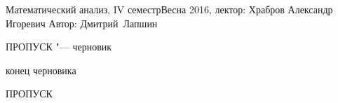 


\BigHeader
    {Математический анализ, IV семестр}{Весна 2016, лектор: Храбров Александр Игоревич}
    {Автор: Дмитрий~Лапшин}
\gdef\LectureName{Мат. анализ, IV семестр}











\begin{center}ПРОПУСК "--- черновик\end{center}

\begin{center}конец черновика\end{center}



\begin{center}ПРОПУСК\end{center}



